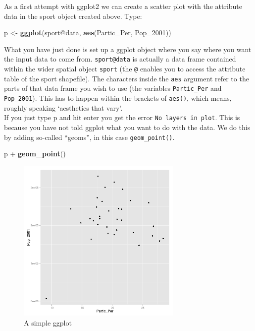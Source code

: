 \documentclass[]{article}
\newenvironment{Shaded}{}{}
\newcommand{\KeywordTok}[1]{\textcolor[rgb]{0.00,0.44,0.13}{\textbf{{#1}}}}
\newcommand{\NormalTok}[1]{{#1}}
\begin{document}
As a first attempt with ggplot2 we can create a scatter plot with the
attribute data in the sport object created above. Type:

\begin{Shaded}
\begin{Highlighting}[]
\NormalTok{p <- }\KeywordTok{ggplot}\NormalTok{(sport@data, }\KeywordTok{aes}\NormalTok{(Partic_Per, Pop_2001))}
\end{Highlighting}
\end{Shaded}
What you have just done is set up a ggplot object where you say where
you want the input data to come from. \texttt{sport@data} is actually a
data frame contained within the wider spatial object \texttt{sport} (the
\texttt{@} enables you to access the attribute table of the sport
shapefile). The characters inside the \texttt{aes} argument refer to the
parts of that data frame you wish to use (the variables
\texttt{Partic\_Per} and \texttt{Pop\_2001}). This has to happen within
the brackets of \texttt{aes()}, which means, roughly speaking
`aesthetics that vary'.\\If you just type p and hit enter you get the
error \texttt{No layers in plot}. This is because you have not told
ggplot what you want to do with the data. We do this by adding so-called
``geoms'', in this case \texttt{geom\_point()}.

\begin{Shaded}
\begin{Highlighting}[]
\NormalTok{p + }\KeywordTok{geom_point}\NormalTok{()}
\end{Highlighting}
\end{Shaded}
\begin{figure}[htbp]
\centering
\includegraphics[width=8cm]{figure/A_simple_ggplot.png}
\caption{A simple ggplot}
\end{figure}
\end{document}
